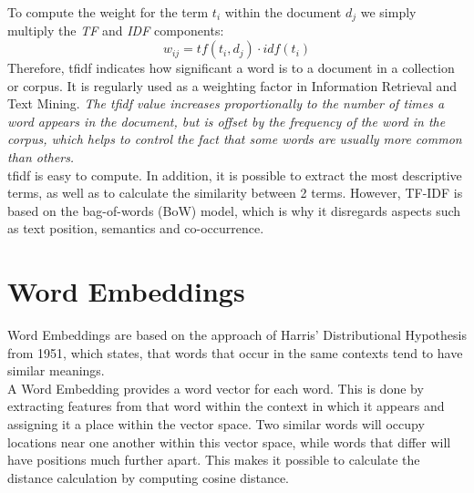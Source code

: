 \documentclass[a4paper, 11pt,titlepage,oneside,openany]{book}
\begin{document}
\noindent To compute the weight for the term $t_i$ within the document $d_j$ we simply multiply the \textit{TF} and \textit{IDF} components:
\[
w_{ij}=tf(t_i, d_j)\cdot idf(t_i)
\]
Therefore, \Gls{tfidf} indicates how significant a word is to a document in a collection or corpus. It is regularly used as a weighting factor in Information Retrieval and Text Mining. \textit{The \Gls{tfidf} value increases proportionally to the number of times a word appears in the document, but is offset by the frequency of the word in the corpus, which helps to control the fact that some words are usually more common than others.}\\
\noindent \Gls{tfidf} is easy to compute. In addition, it is possible to extract the most descriptive terms, as well as to calculate the similarity between 2 terms. However, TF-IDF is based on the bag-of-words (BoW) model, which is why it disregards aspects such as text position, semantics and co-occurrence.

\section{Word Embeddings}
Word Embeddings are based on the approach of Harris' Distributional Hypothesis \cite{distributionalhypothesis} from 1951, which states, that words that occur in the same contexts tend to have similar meanings. \\
\noindent A Word Embedding provides a word vector for each word. This is done by extracting features from that word within the context in which it appears and assigning it a place within the vector space. Two similar words will occupy locations near one another within this vector space, while words that differ will have positions much further apart. This makes it possible to calculate the distance calculation by computing cosine distance.
\end{document}
